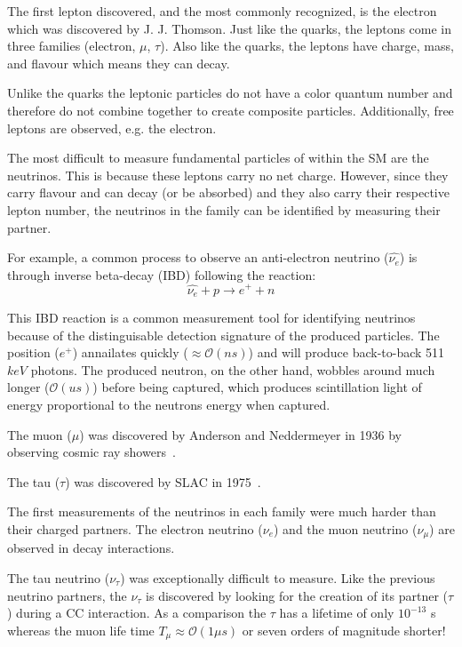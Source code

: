 The first lepton discovered, and the most commonly recognized, is the electron which was discovered by J. J. Thomson.
Just like the quarks, the leptons come in three families (electron, $\mu$, $\tau$).
Also like the quarks, the leptons have charge, mass, and flavour which means they can decay.

Unlike the quarks the leptonic particles do not have a color quantum number and therefore do not combine together to create composite particles.
Additionally, free leptons are observed, e.g. the electron.

The most difficult to measure fundamental particles of within the SM are the neutrinos.
This is because these leptons carry no net charge.
However, since they carry flavour and can decay (or be absorbed) and they also carry their respective lepton number, the neutrinos in the family can be identified by measuring their partner.

For example, a common process to observe an anti-electron neutrino ($\hat{\nu_{e}}$) is through inverse beta-decay (IBD) following the reaction:
\begin{equation}
\hat{\nu_{e}} + p \rightarrow e^{+} + n
\end{equation}

This IBD reaction is a common measurement tool for identifying neutrinos because of the distinguisable detection signature of the produced particles.
The position ($e^{+}$) annailates quickly ($\approx \mathcal{O}(ns)$) and will produce back-to-back 511 $keV$ photons.
The produced neutron, on the other hand, wobbles around much longer ($\mathcal{O}(us)$) before being captured, which produces scintillation light of energy proportional to the neutrons energy when captured.

The muon ($\mu$) was discovered by Anderson and Neddermeyer in 1936 by observing cosmic ray showers~\citep{muon_discovery_PhysRev.51.884}.

The tau ($\tau$) was discovered by SLAC in 1975~\citep{tau_discovery_PhysRevLett.35.1489}.

The first measurements of the neutrinos in each family were much harder than their charged partners.
The electron neutrino ($\nu_{e}$) and the muon neutrino ($\nu_{\mu}$) are observed in decay interactions.

The tau neutrino ($\nu_{\tau}$) was exceptionally difficult to measure.
Like the previous neutrino partners, the $\nu_{\tau}$ is discovered by looking for the creation of its partner ($\tau$) during a CC interaction.
As a comparison the $\tau$ has a lifetime of only $10^{-13}$ s whereas the muon life time $T_{\mu}\approx \mathcal{O}(1 \mu s)$ or seven orders of magnitude shorter!

